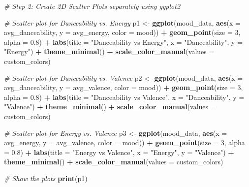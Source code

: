 \documentclass[
]{article}
\newenvironment{Shaded}{\begin{snugshade}}{\end{snugshade}}
\newcommand{\AttributeTok}[1]{\textcolor[rgb]{0.13,0.29,0.53}{#1}}
\newcommand{\CommentTok}[1]{\textcolor[rgb]{0.56,0.35,0.01}{\textit{#1}}}
\newcommand{\DecValTok}[1]{\textcolor[rgb]{0.00,0.00,0.81}{#1}}
\newcommand{\FloatTok}[1]{\textcolor[rgb]{0.00,0.00,0.81}{#1}}
\newcommand{\FunctionTok}[1]{\textcolor[rgb]{0.13,0.29,0.53}{\textbf{#1}}}
\newcommand{\NormalTok}[1]{#1}
\newcommand{\OtherTok}[1]{\textcolor[rgb]{0.56,0.35,0.01}{#1}}
\newcommand{\SpecialCharTok}[1]{\textcolor[rgb]{0.81,0.36,0.00}{\textbf{#1}}}
\newcommand{\StringTok}[1]{\textcolor[rgb]{0.31,0.60,0.02}{#1}}
\begin{document}
\begin{Shaded}
\begin{Highlighting}[]
\CommentTok{\# Step 2: Create 2D Scatter Plots separately using ggplot2}

\CommentTok{\# Scatter plot for Danceability vs. Energy}
\NormalTok{p1 }\OtherTok{\textless{}{-}} \FunctionTok{ggplot}\NormalTok{(mood\_data, }\FunctionTok{aes}\NormalTok{(}\AttributeTok{x =}\NormalTok{ avg\_danceability, }\AttributeTok{y =}\NormalTok{ avg\_energy, }\AttributeTok{color =}\NormalTok{ mood)) }\SpecialCharTok{+}
  \FunctionTok{geom\_point}\NormalTok{(}\AttributeTok{size =} \DecValTok{3}\NormalTok{, }\AttributeTok{alpha =} \FloatTok{0.8}\NormalTok{) }\SpecialCharTok{+}
  \FunctionTok{labs}\NormalTok{(}\AttributeTok{title =} \StringTok{"Danceability vs Energy"}\NormalTok{,}
       \AttributeTok{x =} \StringTok{"Danceability"}\NormalTok{,}
       \AttributeTok{y =} \StringTok{"Energy"}\NormalTok{) }\SpecialCharTok{+}
  \FunctionTok{theme\_minimal}\NormalTok{() }\SpecialCharTok{+}
  \FunctionTok{scale\_color\_manual}\NormalTok{(}\AttributeTok{values =}\NormalTok{ custom\_colors)}

\CommentTok{\# Scatter plot for Danceability vs. Valence}
\NormalTok{p2 }\OtherTok{\textless{}{-}} \FunctionTok{ggplot}\NormalTok{(mood\_data, }\FunctionTok{aes}\NormalTok{(}\AttributeTok{x =}\NormalTok{ avg\_danceability, }\AttributeTok{y =}\NormalTok{ avg\_valence, }\AttributeTok{color =}\NormalTok{ mood)) }\SpecialCharTok{+}
  \FunctionTok{geom\_point}\NormalTok{(}\AttributeTok{size =} \DecValTok{3}\NormalTok{, }\AttributeTok{alpha =} \FloatTok{0.8}\NormalTok{) }\SpecialCharTok{+}
  \FunctionTok{labs}\NormalTok{(}\AttributeTok{title =} \StringTok{"Danceability vs Valence"}\NormalTok{,}
       \AttributeTok{x =} \StringTok{"Danceability"}\NormalTok{,}
       \AttributeTok{y =} \StringTok{"Valence"}\NormalTok{) }\SpecialCharTok{+}
  \FunctionTok{theme\_minimal}\NormalTok{() }\SpecialCharTok{+}
  \FunctionTok{scale\_color\_manual}\NormalTok{(}\AttributeTok{values =}\NormalTok{ custom\_colors)}

\CommentTok{\# Scatter plot for Energy vs. Valence}
\NormalTok{p3 }\OtherTok{\textless{}{-}} \FunctionTok{ggplot}\NormalTok{(mood\_data, }\FunctionTok{aes}\NormalTok{(}\AttributeTok{x =}\NormalTok{ avg\_energy, }\AttributeTok{y =}\NormalTok{ avg\_valence, }\AttributeTok{color =}\NormalTok{ mood)) }\SpecialCharTok{+}
  \FunctionTok{geom\_point}\NormalTok{(}\AttributeTok{size =} \DecValTok{3}\NormalTok{, }\AttributeTok{alpha =} \FloatTok{0.8}\NormalTok{) }\SpecialCharTok{+}
  \FunctionTok{labs}\NormalTok{(}\AttributeTok{title =} \StringTok{"Energy vs Valence"}\NormalTok{,}
       \AttributeTok{x =} \StringTok{"Energy"}\NormalTok{,}
       \AttributeTok{y =} \StringTok{"Valence"}\NormalTok{) }\SpecialCharTok{+}
  \FunctionTok{theme\_minimal}\NormalTok{() }\SpecialCharTok{+}
  \FunctionTok{scale\_color\_manual}\NormalTok{(}\AttributeTok{values =}\NormalTok{ custom\_colors)}

\CommentTok{\# Show the plots}
\FunctionTok{print}\NormalTok{(p1)}
\end{Highlighting}
\end{Shaded}
\end{document}
